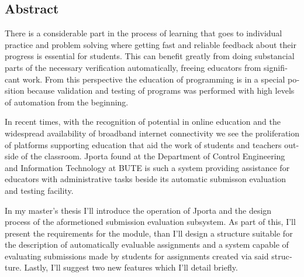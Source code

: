 \begin{otherlanguage}{english}
\chapter*{Abstract}

There is a considerable part in the process of learning that goes to individual practice and problem solving where getting fast and reliable feedback about their progress is essential for students.
This can benefit greatly from doing substancial parts of the necessary verification automatically, freeing educators from significant work.
From this perspective the education of programming is in a special position because validation and testing of programs was performed with high levels of automation from the beginning.

In recent times, with the recognition of potential in online education and the widespread availability of broadband internet connectivity we see the proliferation of platforms supporting education that aid the work of students and teachers outside of the classroom.
Jporta found at the Department of Control Engineering and Information Technology at BUTE is such a system providing assistance for educators with administrative tasks beside its automatic submisson evaluation and testing facility.

In my master's thesis I'll introduce the operation of Jporta and the design process of the aformetioned submission evaluation subsystem.
As part of this, I'll present the requirements for the module, than I'll design a structure suitable for the description of automatically evaluable assignments and a system capable of evaluating submissions made by students for assignments created via said structure.
Lastly, I'll suggest two new features which I'll detail briefly.
\end{otherlanguage}
\vfill

